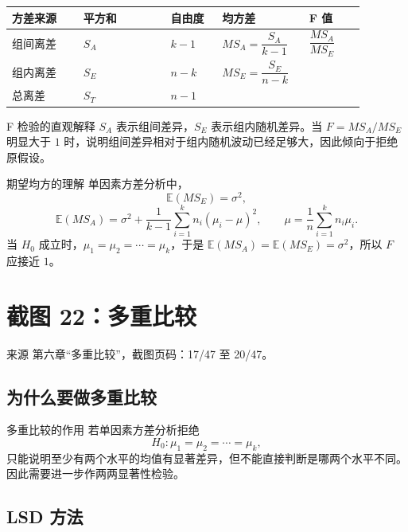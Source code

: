 \documentclass[UTF8,zihao=-4,fontset=fandol]{ctexart}
\newcommand{\E}{\mathbb{E}}
\begin{document}
\begin{longtable}{@{}p{0.18\linewidth}p{0.22\linewidth}p{0.13\linewidth}p{0.21\linewidth}p{0.14\linewidth}@{}}
\toprule
\textbf{方差来源} & \textbf{平方和} & \textbf{自由度} & \textbf{均方差} & \textbf{F 值} \\
\midrule
组间离差 & $S_A$ & $k-1$ & $MS_A=\dfrac{S_A}{k-1}$ & $\dfrac{MS_A}{MS_E}$ \\
组内离差 & $S_E$ & $n-k$ & $MS_E=\dfrac{S_E}{n-k}$ & \\
总离差 & $S_T$ & $n-1$ & & \\
\bottomrule
\end{longtable}

\begin{keybox}{F 检验的直观解释}
$S_A$ 表示组间差异，$S_E$ 表示组内随机差异。当 $F=MS_A/MS_E$ 明显大于 $1$ 时，说明组间差异相对于组内随机波动已经足够大，因此倾向于拒绝原假设。
\end{keybox}

\begin{keybox}{期望均方的理解}
单因素方差分析中，
\[
\E(MS_E)=\sigma^2,
\]
\[
\E(MS_A)=\sigma^2+\frac{1}{k-1}\sum_{i=1}^{k}n_i(\mu_i-\mu)^2,
\qquad
\mu=\frac{1}{n}\sum_{i=1}^{k}n_i\mu_i.
\]
当 $H_0$ 成立时，$\mu_1=\mu_2=\cdots=\mu_k$，于是 $\E(MS_A)=\E(MS_E)=\sigma^2$，所以 $F$ 应接近 $1$。
\end{keybox}

\section{截图 22：多重比较}

\begin{sourcebox}{来源}
第六章“多重比较”，截图页码：17/47 至 20/47。
\end{sourcebox}

\subsection{为什么要做多重比较}

\begin{keybox}{多重比较的作用}
若单因素方差分析拒绝
\[
H_0:\mu_1=\mu_2=\cdots=\mu_k,
\]
只能说明至少有两个水平的均值有显著差异，但不能直接判断是哪两个水平不同。因此需要进一步作两两显著性检验。
\end{keybox}

\subsection{LSD 方法}
\end{document}
